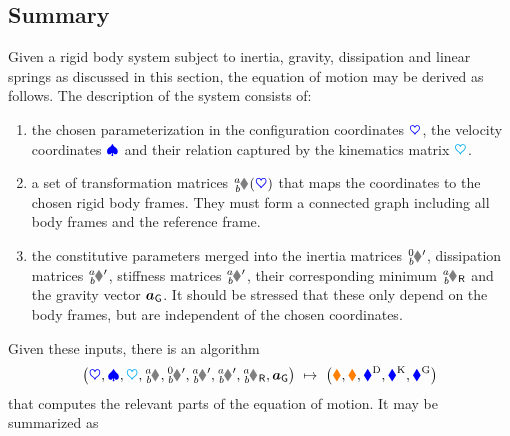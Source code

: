 \subsection{Summary}\label{sec:MechRBSSummary}
Given a rigid body system subject to inertia, gravity, dissipation and linear springs as discussed in this section, the equation of motion may be derived as follows.
The description of the system consists of:
\begin{enumerate}
 \item the chosen parameterization in the configuration coordinates $\boldsymbol{\textcolor{blue}{\heartsuit}}$, the velocity coordinates $\boldsymbol{\textcolor{blue}{\spadesuit}}$ and their relation captured by the kinematics matrix $\boldsymbol{\textcolor{cyan}{\heartsuit}}$.
 \item a set of transformation matrices $\bodyHomoCoord{\BidxI}{\BidxII}(\sysCoord)$ that maps the coordinates to the chosen rigid body frames. 
 They must form a connected graph including all body frames and the reference frame.
 \item the constitutive parameters merged into the inertia matrices $\bodyInertiaMatp{0}{\BidxII}$, dissipation matrices $\bodyDissMatp{\BidxI}{\BidxII}$, stiffness matrices $\bodyStiffMatp{\BidxI}{\BidxII}$, their corresponding minimum $\bodyHomoCoordR{\BidxI}{\BidxII}$ and the gravity vector $\boldsymbol{a}_{\mathsf{G}}$.
 It should be stressed that these only depend on the body frames, but are independent of the chosen coordinates.
\end{enumerate}
Given these inputs, there is an algorithm 
\begin{align}
 \big( \sysCoord, \sysVel, \kinMat, \bodyHomoCoord{\BidxI}{\BidxII}, \bodyInertiaMatp{0}{\BidxII}, \bodyDissMatp{\BidxI}{\BidxII}, \bodyStiffMatp{\BidxI}{\BidxII}, \bodyHomoCoordR{\BidxI}{\BidxII}, \gravityAcc \big) \ \mapsto \ \big( \sysInertiaMat, \gyroForce, \genForceDiss, \genForceStiff, \genForceGravity \big)
\end{align}
that computes the relevant parts of the equation of motion.
It may be summarized as
